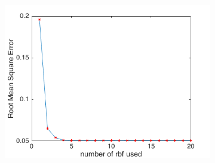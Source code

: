 \documentclass{article}
\begin{document}
\begin{enumerate}[label=(\alph*)]
\begin{figure}[htbp]
\begin{subfigure}{0.5\textwidth}
				 			\caption{}
				 			\label{fig:p-1-3-a_b}
				 		\end{subfigure}\\
				 		\begin{subfigure}{0.5\textwidth}
				 			\includegraphics[width=\linewidth]{images/p1-3-a_1_20.png}
				 			\caption{}
				 			\label{fig:p-1-3-a_c}
				 		\end{subfigure}


\end{figure}
\end{enumerate}
\end{document}
